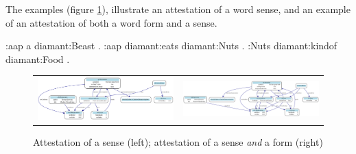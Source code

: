 \documentclass[10pt]{article}
\begin{document}
 The examples (figure \ref{fig:ex2}), illustrate an attestation of a word sense, and an example of an attestation of both a word form and a sense.\par

\begin{rdf}[voorbeeld1]:aap a diamant:Beast .
:aap diamant:eats diamant:Nuts .
:Nuts diamant:kindof diamant:Food .
\end{rdf}




 
 \begin{figure}
 \begin{tabular}{cc}
     	\includegraphics[width=\textheight, angle=90]{./example_1.pdf}  &  
     	\includegraphics[width=\textheight, angle=90]{./example_2.pdf}
 \end{tabular}

\caption{Attestation of a sense (left); attestation of a sense \textit{and} a form (right) }
\label{fig:ex2}
 \end{figure}







\end{document}
